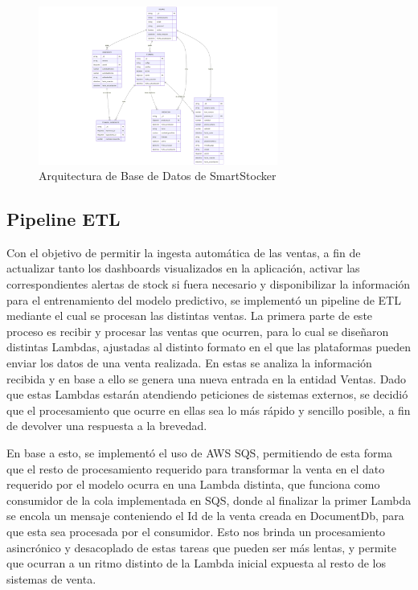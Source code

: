 \begin{figure}[htbp]
    \centering
    \includegraphics[width=0.7\textwidth]{images/arquitectura-base-datos.png}
    \caption{Arquitectura de Base de Datos de SmartStocker}
    \label{fig:arquitectura-base-datos}
\end{figure}

\subsection{Pipeline ETL}\label{sec:pipeline-etl}

Con el objetivo de permitir la ingesta automática de las ventas, a fin de actualizar tanto los dashboards visualizados en la aplicación, activar las correspondientes alertas de stock si fuera necesario y disponibilizar la información para el entrenamiento del modelo predictivo, se implementó un pipeline de ETL mediante el cual se procesan las distintas ventas. La primera parte de este proceso es recibir y procesar las ventas que ocurren, para lo cual se diseñaron distintas Lambdas, ajustadas al distinto formato en el que las plataformas pueden enviar los datos de una venta realizada. En estas se analiza la información recibida y en base a ello se genera una nueva entrada en la entidad Ventas. Dado que estas Lambdas estarán atendiendo peticiones de sistemas externos, se decidió que el procesamiento que ocurre en ellas sea lo más rápido y sencillo posible, a fin de devolver una respuesta a la brevedad.

En base a esto, se implementó el uso de AWS SQS, permitiendo de esta forma que el resto de procesamiento requerido para transformar la venta en el dato requerido por el modelo ocurra en una Lambda distinta, que funciona como consumidor de la cola implementada en SQS, donde al finalizar la primer Lambda se encola un mensaje conteniendo el Id de la venta creada en DocumentDb, para que esta sea procesada por el consumidor. Esto nos brinda un procesamiento asincrónico y desacoplado de estas tareas que pueden ser más lentas, y permite que ocurran a un ritmo distinto de la Lambda inicial expuesta al resto de los sistemas de venta.

